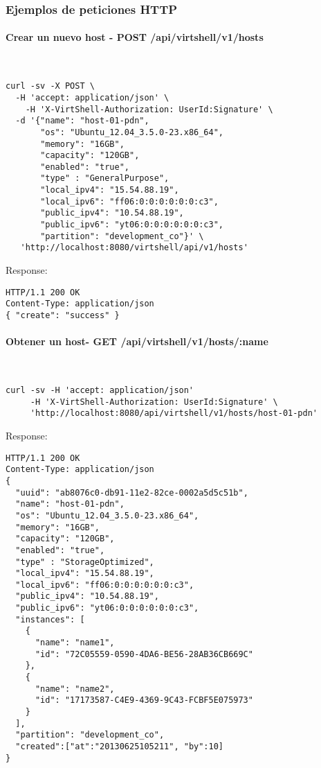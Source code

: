 \subsubsection{Ejemplos de peticiones HTTP}

\paragraph{Crear un nuevo host - POST /api/virtshell/v1/hosts} ~\\

\begin{lstlisting}[style=json]
curl -sv -X POST \
  -H 'accept: application/json' \
    -H 'X-VirtShell-Authorization: UserId:Signature' \
  -d '{"name": "host-01-pdn",
       "os": "Ubuntu_12.04_3.5.0-23.x86_64",
       "memory": "16GB",
       "capacity": "120GB",
       "enabled": "true",
       "type" : "GeneralPurpose",
       "local_ipv4": "15.54.88.19",
       "local_ipv6": "ff06:0:0:0:0:0:0:c3",
       "public_ipv4": "10.54.88.19",
       "public_ipv6": "yt06:0:0:0:0:0:0:c3",
       "partition": "development_co"}' \
   'http://localhost:8080/virtshell/api/v1/hosts'
\end{lstlisting}

Response:

\begin{lstlisting}[style=json]
HTTP/1.1 200 OK
Content-Type: application/json
{ "create": "success" }
\end{lstlisting}

\paragraph{Obtener un host- GET /api/virtshell/v1/hosts/:name} ~\\

\begin{lstlisting}[style=json]
curl -sv -H 'accept: application/json' 
     -H 'X-VirtShell-Authorization: UserId:Signature' \ 
     'http://localhost:8080/api/virtshell/v1/hosts/host-01-pdn'
\end{lstlisting}

Response:

\begin{lstlisting}[style=json]
HTTP/1.1 200 OK
Content-Type: application/json
{
  "uuid": "ab8076c0-db91-11e2-82ce-0002a5d5c51b",
  "name": "host-01-pdn",
  "os": "Ubuntu_12.04_3.5.0-23.x86_64",
  "memory": "16GB",
  "capacity": "120GB",
  "enabled": "true",
  "type" : "StorageOptimized",
  "local_ipv4": "15.54.88.19",
  "local_ipv6": "ff06:0:0:0:0:0:0:c3",
  "public_ipv4": "10.54.88.19",
  "public_ipv6": "yt06:0:0:0:0:0:0:c3",
  "instances": [
    {
      "name": "name1",
      "id": "72C05559-0590-4DA6-BE56-28AB36CB669C"
    },
    {
      "name": "name2",
      "id": "17173587-C4E9-4369-9C43-FCBF5E075973"
    }
  ],
  "partition": "development_co",
  "created":["at":"20130625105211", "by":10]
}
\end{lstlisting}

